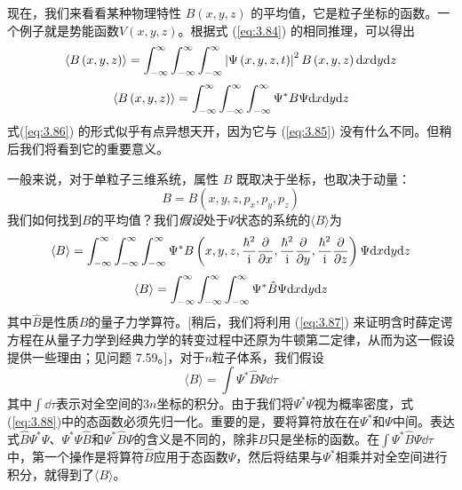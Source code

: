 	现在，我们来看看某种物理特性 $B\left(x,y,z\right)$ 的平均值，它是粒子坐标的函数。一个例子就是势能函数$V\left(x,y,z\right)$。根据式 (\ref{eq:3.84}) 的相同推理，可以得出
	\begin{equation}
		\langle B\left(x,y,z\right) \rangle = \int_{-\infty}^{\infty} \int_{-\infty}^{\infty} \int_{-\infty}^{\infty} \left|\Psi\left(x,y,z,t\right)\right|^2B\left(x,y,z\right)\dd x\dd y\dd z
		\label{eq:3.85}
	\end{equation}
	\begin{equation}
		\langle B\left(x,y,z\right) \rangle = \int_{-\infty}^{\infty} \int_{-\infty}^{\infty} \int_{-\infty}^{\infty} \Psi^{\ast}B\Psi\dd x\dd y\dd z
		\label{eq:3.86}
	\end{equation}
	式(\ref{eq:3.86}) 的形式似乎有点异想天开，因为它与 (\ref{eq:3.85}) 没有什么不同。但稍后我们将看到它的重要意义。

	一般来说，对于单粒子三维系统，属性 $B$ 既取决于坐标，也取决于动量：
	\begin{equation*}
		B = B\left(x,y,z,p_x,p_y,p_z\right)
	\end{equation*}
	我们如何找到$B$的平均值？我们\textit{假设}处于$\Psi$状态的系统的$\langle B \rangle$为
	\begin{equation*}
		\langle B \rangle = \int_{-\infty}^{\infty} \int_{-\infty}^{\infty} \int_{-\infty}^{\infty} \Psi^{\ast}B\left(x,y,z,\frac{\hbar^2}{\mathrm{i} }\frac{\partial}{\partial x},\frac{\hbar^2}{\mathrm{i} }\frac{\partial}{\partial y},\frac{\hbar^2}{\mathrm{i} }\frac{\partial}{\partial z}\right)\Psi\dd x\dd y\dd z
	\end{equation*}
	\begin{equation}
		\langle B \rangle = \int_{-\infty}^{\infty} \int_{-\infty}^{\infty} \int_{-\infty}^{\infty} \Psi^{\ast}\hat{B}\Psi\dd x\dd y\dd z
		\label{eq:3.87}
	\end{equation}
	其中$\hat{B}$是性质$B$的量子力学算符。[稍后，我们将利用 (\ref{eq:3.87}) 来证明含时薛定谔方程在从量子力学到经典力学的转变过程中还原为牛顿第二定律，从而为这一假设提供一些理由；见问题 7.59。]，对于$n$粒子体系，我们假设
	\begin{equation}
		\boxed{
			\langle B \rangle = \int \Psi^{\ast}\hat{B}\Psi\dd \tau
		}
		\label{eq:3.88}
	\end{equation}
	其中$\int\dd \tau$表示对全空间的$3n$坐标的积分。由于我们将$\Psi^{\ast}\Psi$视为概率密度，式(\ref{eq:3.88})中的态函数必须先归一化。重要的是，要将算符放在在$\Psi^{\ast}$和$\Psi$中间。表达式$\hat{B}\Psi^{\ast}\Psi$、$\Psi^{\ast}\Psi\hat{B}$和$\Psi^{\ast}\hat{B}\Psi$的含义是不同的，除非$B$只是坐标的函数。在$\int\Psi^{\ast}\hat{B}\Psi\dd \tau$中，第一个操作是将算符$\hat{B}$应用于态函数$\Psi$，然后将结果与$\Psi^{\ast}$相乘并对全空间进行积分，就得到了$\langle B \rangle$。

